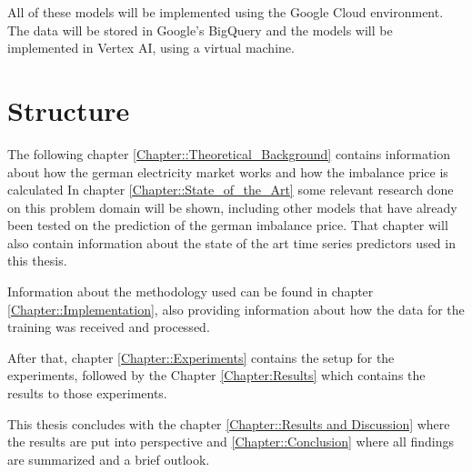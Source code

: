 \documentclass[class=scrbook, crop=false]{standalone}
\begin{document}
All of these models will be implemented using the Google Cloud environment. The data will be stored in Google's BigQuery and the models will be implemented in Vertex AI, using a virtual machine.

\section{Structure}
\label{Section::Structure}
The following chapter \ref{Chapter::Theoretical_Background} contains information about how the german electricity market works and how the imbalance price is calculated
In chapter \ref{Chapter::State_of_the_Art} some relevant research done on this problem domain will be shown, including other models that have already been tested on the prediction of the german imbalance price. 
That chapter will also contain information about the state of the art time series predictors used in this thesis.

Information about the methodology used can be found in chapter \ref{Chapter::Implementation},  also providing information about how the data for the training was received and processed.

After that, chapter \ref{Chapter::Experiments} contains the setup for the experiments, followed by the Chapter \ref{Chapter:Results} which contains the results to those experiments.

This thesis concludes with the chapter \ref{Chapter::Results and Discussion} where the results are put into perspective and \ref{Chapter::Conclusion} where all findings are summarized and a brief outlook.

\ifstandalone
    \printglossary
    \printbibliography[heading=bibintoc]
\fi
\end{document}
